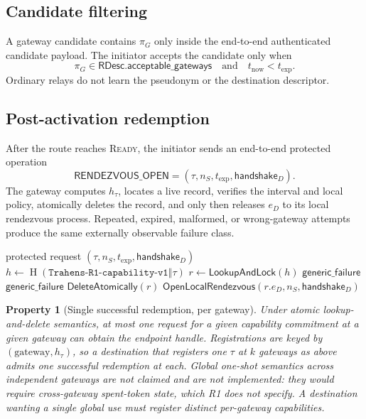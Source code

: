 \documentclass[11pt,oneside]{article}
\newcommand{\concat}{\mathbin\Vert}
\newcommand{\Hash}{\operatorname{H}}
\newcommand{\Rone}{\ensuremath{\mathsf{R1}}}
\newcommand{\code}[1]{\texttt{#1}}
\newtheorem{property}{Property}
\begin{document}
\subsection{Candidate filtering}

A gateway candidate contains $\pi_G$ only inside the end-to-end authenticated candidate payload. The initiator accepts the candidate only when
\begin{equation}
\pi_G\in\mathsf{RDesc}.\mathsf{acceptable\_gateways}
\quad\text{and}\quad t_{\mathrm{now}}<t_{\mathrm{exp}}.
\end{equation}
Ordinary relays do not learn the pseudonym or the destination descriptor.

\subsection{Post-activation redemption}

After the route reaches \textsc{Ready}, the initiator sends an end-to-end protected operation
\begin{equation}
\mathsf{RENDEZVOUS\_OPEN}=
\left(\tau,n_S,t_{\mathrm{exp}},\mathsf{handshake}_D\right).
\label{eq:open}
\end{equation}
The gateway computes $h_\tau$, locates a live record, verifies the interval and local policy, atomically deletes the record, and only then releases $e_D$ to its local rendezvous process. Repeated, expired, malformed, or wrong-gateway attempts produce the same externally observable failure class.

\begin{algorithm}[ht]
\caption{Atomic \Rone{} redemption at gateway $G$}
\label{alg:redemption}
\begin{algorithmic}[1]
\Require protected request $(\tau,n_S,t_{\mathrm{exp}},\mathsf{handshake}_D)$
\State $h\gets\Hash(\code{Trahens-R1-capability-v1}\concat\tau)$
\State $r\gets\mathsf{LookupAndLock}(h)$
\If{$r=\bot$ or $\tau=0^{256}$ or $t_{\mathrm{now}}\notin[r.t_c,r.t_e)$}
  \State \Return $\mathsf{generic\_failure}$
\EndIf
{}
  \State \Return $\mathsf{generic\_failure}$
\EndIf
\State $\mathsf{DeleteAtomically}(r)$
\State \Return $\mathsf{OpenLocalRendezvous}(r.e_D,n_S,\mathsf{handshake}_D)$
\end{algorithmic}
\end{algorithm}

\begin{property}[Single successful redemption, per gateway]
Under atomic lookup-and-delete semantics, at most one request for a given capability commitment \emph{at a given gateway} can obtain the endpoint handle. Registrations are keyed by $(\text{gateway}, h_\tau)$, so a destination that registers one $\tau$ at $k$ gateways as above admits one successful redemption at each. Global one-shot semantics across independent gateways are not claimed and are not implemented: they would require cross-gateway spent-token state, which R1 does not specify. A destination wanting a single global use must register distinct per-gateway capabilities.
\end{property}
\end{document}
